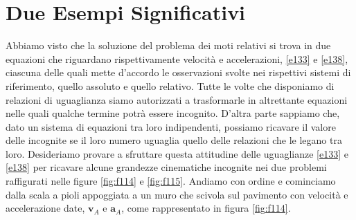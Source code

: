 \section{Due Esempi Significativi}
\label{par:esempi_moti_rel}

\noindent Abbiamo visto che la soluzione del problema dei
moti relativi si trova in due equazioni che riguardano rispettivamente velocit\`a
e accelerazioni, \ref{e133} e \ref{e138}, ciascuna delle quali mette d'accordo le osservazioni
svolte nei rispettivi sistemi di riferimento, quello assoluto e quello relativo.
Tutte le volte che disponiamo di relazioni di uguaglianza 
siamo autorizzati
a trasformarle in altrettante equazioni
nelle quali qualche termine potr\`a essere incognito.
D'altra parte sappiamo che, dato un sistema di
equazioni tra loro indipendenti, possiamo ricavare il valore delle incognite
se il loro numero uguaglia quello delle relazioni che le legano tra loro.
Desideriamo provare a sfruttare questa attitudine delle uguaglianze \ref{e133} e \ref{e138} per
ricavare alcune grandezze cinematiche incognite
nei due problemi raffigurati nelle figure
\ref{fig:f114} e \ref{fig:f115}.
Andiamo con ordine e cominciamo dalla scala a pioli appoggiata a un muro
che scivola sul pavimento con velocit\`a e accelerazione date,
${{\bm v}_{\scriptscriptstyle{A}}}$ e ${{\bm a}_{\scriptscriptstyle{A}}}$, come rappresentato in figura \ref{fig:f114}.


